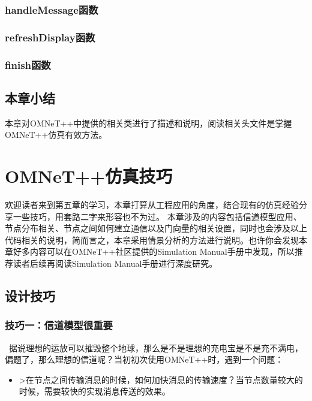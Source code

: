 \subsection{handleMessage函数}
\label{handlemessage函数}

\subsection{refreshDisplay函数}
\label{refreshdisplay函数}

\subsection{finish函数}
\label{finish函数}

\section{本章小结}
\label{本章小结}

本章对OMNeT++中提供的相关类进行了描述和说明，阅读相关头文件是掌握OMNeT++仿真有效方法。

\chapter{OMNeT++仿真技巧}
\label{omnet仿真技巧}

欢迎读者来到第五章的学习，本章打算从工程应用的角度，结合现有的仿真经验分享一些技巧，用套路二字来形容也不为过。
本章涉及的内容包括信道模型应用、节点分布相关、节点之间如何建立通信以及门向量的相关设置，同时也会涉及以上代码相关的说明，简而言之，本章采用情景分析的方法进行说明。也许你会发现本章好多内容可以在OMNeT++社区提供的Simulation Manual手册中发现，所以推荐读者后续再阅读Simulation Manual手册进行深度研究。

\section{设计技巧}
\label{设计技巧}

\subsection{技巧一：信道模型很重要}
\label{技巧一：信道模型很重要}

 据说理想的运放可以摧毁整个地球，那么是不是理想的充电宝是不是充不满电，偏题了，那么理想的信道呢？当初初次使用OMNeT++时，遇到一个问题：

\begin{itemize}
\item >在节点之间传输消息的时候，如何加快消息的传输速度？当节点数量较大的时候，需要较快的实现消息传送的效果。

\end{itemize}

